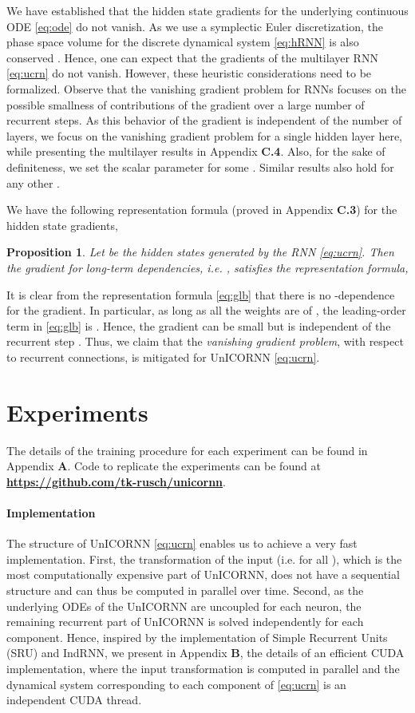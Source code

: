 \documentclass{article}
\newtheorem{proposition}[theorem]{Proposition}
\begin{document}
We have established that the hidden state gradients for the underlying continuous ODE \eqref{eq:ode} do not vanish. As we use a symplectic Euler discretization, the phase space volume for the discrete dynamical system \eqref{eq:hRNN} is also conserved \cite{ss1,HLW1}. Hence, one can expect that the gradients of the multilayer RNN \eqref{eq:ucrn} do not vanish. However, these heuristic considerations need to be formalized. Observe that the vanishing gradient problem for RNNs focuses on the possible smallness of contributions of the gradient over a large number of recurrent steps. As this behavior of the gradient is independent of the number of layers, we focus on the vanishing gradient problem for a single hidden layer here, while presenting the multilayer results in Appendix {\bf C.4}. Also, for the sake of definiteness, we set the scalar parameter  for some . Similar results also hold for any other . 

We have the following representation formula (proved in Appendix {\bf C.3}) for the hidden state gradients,
\begin{proposition}
\label{prop:4}
Let  be the hidden states generated by the RNN \eqref{eq:ucrn}.  Then the gradient for long-term dependencies, i.e. , satisfies the representation formula,

\end{proposition}
It is clear from the representation formula \eqref{eq:glb} that there is no -dependence for the gradient. In particular, as long as all the weights are of , the leading-order term in \eqref{eq:glb} is . Hence, the gradient can be small but is independent of the recurrent step . Thus, we claim that the \emph{vanishing gradient problem}, with respect to recurrent connections, is mitigated for UnICORNN \eqref{eq:ucrn}.  
\section{Experiments}
The details of the training procedure
for each experiment can be found in Appendix {\bf A}. Code to replicate the experiments can be found at
\href{https://github.com/tk-rusch/unicornn}{\textbf{https://github.com/tk-rusch/unicornn}}.
\paragraph{Implementation}
The structure of UnICORNN \eqref{eq:ucrn} enables us to achieve a very fast implementation. First, the transformation of the input (i.e.  for all ), which is the most computationally expensive part of UnICORNN, does not have a sequential structure and can thus be computed in parallel over time. Second, as the underlying ODEs of the UnICORNN are uncoupled for each neuron, the remaining recurrent part of UnICORNN is solved independently for each component. Hence, inspired by the implementation of Simple Recurrent Units (SRU) \citep{sru} and IndRNN, we present in Appendix {\bf B}, the details of an efficient CUDA implementation, where the input transformation is computed in parallel and the dynamical system corresponding to each component of \eqref{eq:ucrn} is an independent CUDA thread. 
\end{document}
